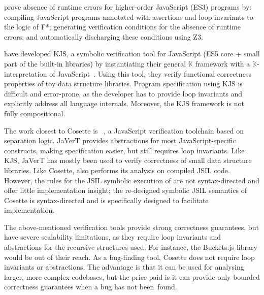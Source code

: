 \documentclass[sigconf, review]{acmart}
\newcommand{\jsil}{JSIL\xspace}
\newcommand{\cosette}{Cosette\xspace}
\newcommand{\myparagraph}[1]{\smallskip\noindent {\bf #1.}\hspace{1pt}}
\begin{document}
\citet{swamy:pldi:2013} prove absence of runtime errors for higher-order JavaScript (ES3) programs by: compiling JavaScript programs annotated with assertions and loop invariants to the logic of F*; generating verification conditions for the absence of runtime errors; and automatically discharging these conditions using Z3.

\citet{stefanescu:oopsla:2016} have developed KJS, a symbolic verification tool for JavaScript (ES5 core + small part of the built-in libraries) by instantiating their general $\mathbb{K}$ framework with a $\mathbb{K}$-interpretation of JavaScript~\cite{Park:2015}. Using this tool, they verify functional correctness properties of toy data structure libraries. 
Program specification using KJS is difficult and error-prone, as the developer has to provide loop invariants and explicitly address all language internals. Moreover, the KJS framework is not fully compositional.

The work closest to \cosette is \javert~\cite{javert}, a JavaScript verification toolchain based on separation logic. JaVerT provides abstractions for most JavaScript-specific constructs, making specification easier, but still requires loop invariants. Like KJS, JaVerT has mostly been used to verify correctness of small data structure libraries. Like \cosette, \javert also performs its analysis on compiled \jsil code. However, the rules for the \jsil symbolic execution of \javert are not syntax-directed and offer little implementation insight; the re-designed symbolic \jsil semantics of \cosette is syntax-directed and is specifically designed to facilitate implementation.

The above-mentioned verification tools provide strong correctness guarantees, but have severe scalability limitations, as they require loop invariants and abstractions for the recursive structures used. For instance, the Buckets.js library would be out of their reach. As a bug-finding tool, Cosette does not require loop invariants or abstractions. The advantage is that it can be used for analysing larger, more complex codebases, but the price paid is it can provide only bounded correctness guarantees when a bug has not been~found.




\end{document}
